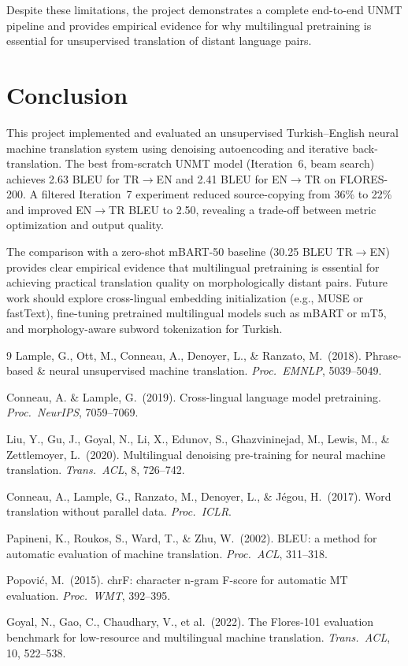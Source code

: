 \documentclass[runningheads]{llncs}
\begin{document}
Despite these limitations, the project demonstrates a complete end-to-end UNMT pipeline and provides empirical evidence for why multilingual pretraining is essential for unsupervised translation of distant language pairs.

\section{Conclusion}

This project implemented and evaluated an unsupervised Turkish--English neural machine translation system using denoising autoencoding and iterative back-translation. The best from-scratch UNMT model (Iteration~6, beam search) achieves 2.63 BLEU for TR$\rightarrow$EN and 2.41 BLEU for EN$\rightarrow$TR on FLORES-200. A filtered Iteration~7 experiment reduced source-copying from 36\% to 22\% and improved EN$\rightarrow$TR BLEU to 2.50, revealing a trade-off between metric optimization and output quality.

The comparison with a zero-shot mBART-50 baseline (30.25 BLEU TR$\rightarrow$EN) provides clear empirical evidence that multilingual pretraining is essential for achieving practical translation quality on morphologically distant pairs. Future work should explore cross-lingual embedding initialization (e.g., MUSE or fastText), fine-tuning pretrained multilingual models such as mBART or mT5, and morphology-aware subword tokenization for Turkish.

\begin{thebibliography}{9}
Lample, G., Ott, M., Conneau, A., Denoyer, L., \& Ranzato, M.~(2018).
Phrase-based \& neural unsupervised machine translation.
\textit{Proc.\ EMNLP}, 5039--5049.

Conneau, A. \& Lample, G.~(2019).
Cross-lingual language model pretraining.
\textit{Proc.\ NeurIPS}, 7059--7069.

Liu, Y., Gu, J., Goyal, N., Li, X., Edunov, S., Ghazvininejad, M., Lewis, M., \& Zettlemoyer, L.~(2020).
Multilingual denoising pre-training for neural machine translation.
\textit{Trans.\ ACL}, 8, 726--742.

Conneau, A., Lample, G., Ranzato, M., Denoyer, L., \& J\'{e}gou, H.~(2017).
Word translation without parallel data.
\textit{Proc.\ ICLR}.

Papineni, K., Roukos, S., Ward, T., \& Zhu, W.~(2002).
BLEU: a method for automatic evaluation of machine translation.
\textit{Proc.\ ACL}, 311--318.

Popovi\'{c}, M.~(2015).
chrF: character n-gram F-score for automatic MT evaluation.
\textit{Proc.\ WMT}, 392--395.

Goyal, N., Gao, C., Chaudhary, V., et al.~(2022).
The Flores-101 evaluation benchmark for low-resource and multilingual machine translation.
\textit{Trans.\ ACL}, 10, 522--538.
\end{thebibliography}
\end{document}
